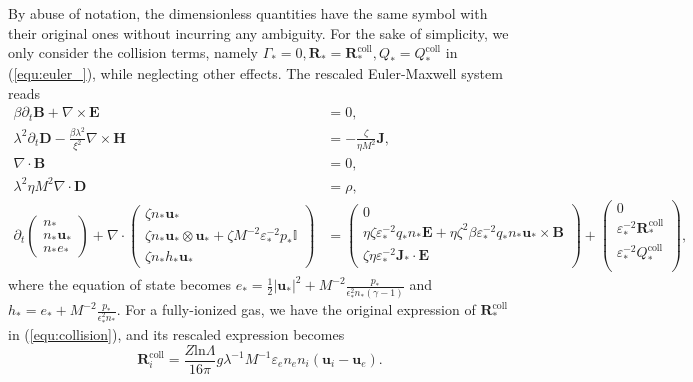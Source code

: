 \documentclass{article}
\begin{document}
By abuse of notation, the dimensionless quantities have the same symbol with their original ones without incurring any ambiguity. For the sake of simplicity, we only consider the collision terms, namely $\Gamma_* = 0, \mathbf{R}_* = \mathbf{R}_*^\text{coll}, Q_* = Q_*^\text{coll}$ in (\ref{equ:euler_}), while neglecting other effects. The rescaled Euler-Maxwell system reads
\begin{subequations}
\begin{align}
    \beta \partial_t \mathbf{B} + \nabla \times \mathbf{E} &= 0, \label{equ:maxwell_faraday_rescalling} \\ 
    \lambda^2 \partial_t \mathbf{D} - \frac{\beta \lambda^2}{\xi^2}\nabla \times \mathbf{H} &= - \frac{\zeta}{\eta M^2}\mathbf{J}, \label{equ:maxwell_ampere_rescalling} \\
    \nabla \cdot \mathbf{B} &= 0,  \label{equ:maxwell_gauss_B_rescalling}\\
    \lambda^2 \eta M^2 \nabla \cdot \mathbf{D} &= \rho, \label{equ:maxwell_gauss_D_rescalling} \\
    \partial_t
    \begin{pmatrix}
    n_* \\
    n_* \mathbf{u}_* \\
    n_* e_*
    \end{pmatrix}
    + \nabla \cdot
    \begin{pmatrix}
    \zeta n_* \mathbf{u}_* \\
    \zeta n_* \mathbf{u}_* \otimes \mathbf{u}_* + \zeta M^{-2} \varepsilon_*^{-2} p_*\mathbb{I} \\
    \zeta n_* h_* \mathbf{u}_*
    \end{pmatrix}
    &=
    \begin{pmatrix}
    0 \\
    \eta \zeta \varepsilon_*^{-2} q_* n_*\mathbf{E} + \eta \zeta^2 \beta \varepsilon_*^{-2} q_* n_* \mathbf{u}_* \times \mathbf{B} \\
    \zeta \eta \varepsilon_*^{-2} \mathbf{J}_* \cdot \mathbf{E}
    \end{pmatrix} +
    \begin{pmatrix}
    0 \\
    \varepsilon_*^{-2}\mathbf{R}_*^{\text{coll}} \\
    \varepsilon_*^{-2}Q_*^{\text{coll}} \\
    \end{pmatrix}, \label{equ:euler_rescalling}
\end{align}
\end{subequations}
where the equation of state becomes $e_* = \frac{1}{2}|\mathbf{u_*}|^2 + M^{-2}\frac{p_*}{\epsilon^2_* n_* (\gamma - 1)}$ and $h_* = e_* + M^{-2}\frac{p_*}{\epsilon^2_* n_*}$. For a fully-ionized gas, we have the original expression of $\mathbf{R}_*^{\text{coll}}$ in (\ref{equ:collision}), and its rescaled expression becomes
\begin{equation*}
    \mathbf{R}_i^{\text{coll}} = \frac{Z\text{ln}\Lambda}{16\pi}g\lambda^{-1}M^{-1}\varepsilon_en_en_i(\mathbf{u}_i - \mathbf{u}_e). 
\end{equation*}
\end{document}
